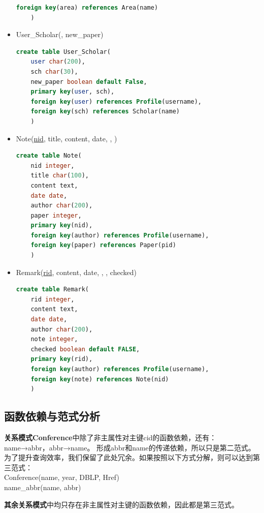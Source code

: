 \begin{itemize}
\begin{lstlisting}[language=SQL]
	foreign key(area) references Area(name)
	)
\end{lstlisting}
\item {\myfont User\_Scholar(, new\_paper)}
\begin{lstlisting}[language=SQL]  
create table User_Scholar(
	user char(200),
	sch char(30),
	new_paper boolean default False,
	primary key(user, sch),
	foreign key(user) references Profile(username),
	foreign key(sch) references Scholar(name)
	)
\end{lstlisting}
\item {\myfont Note(\uline{nid}, title, content, date, , )}
\begin{lstlisting}[language=SQL]  
create table Note(
	nid integer,
	title char(100),
	content text,
	date date,
	author char(200),
	paper integer,
	primary key(nid),
	foreign key(author) references Profile(username),
	foreign key(paper) references Paper(pid)
	)
\end{lstlisting}
\item {\myfont Remark(\uline{rid}, content, date, , , checked)}
\begin{lstlisting}[language=SQL]  
create table Remark(
	rid integer,
	content text,
	date date,
	author char(200),
	note integer,
	checked boolean default FALSE,
	primary key(rid),
	foreign key(author) references Profile(username),
	foreign key(note) references Note(nid)
	)
\end{lstlisting}
\end{itemize}

\subsection{函数依赖与范式分析}

{\bf 关系模式Conference}中除了非主属性对主键cid的函数依赖，还有：name→abbr，abbr→name。
形成abbr和name的传递依赖，所以只是第二范式。为了提升查询效率，我们保留了此处冗余。如果按照以下方式分解，则可以达到第三范式：\\
{\myfont Conference(name, year, DBLP, Href) \\
name\_abbr(name, abbr)}

{\bf 其余关系模式}中均只存在非主属性对主键的函数依赖，因此都是第三范式。